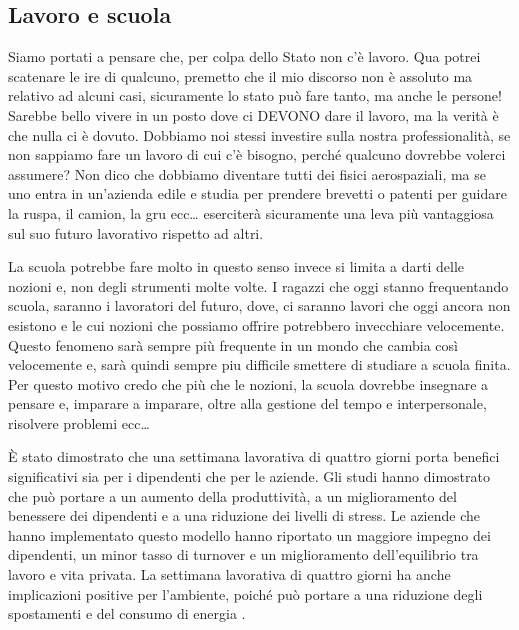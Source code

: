 \documentclass[12pt]{book} %
\begin{document}
\subsection{Lavoro e scuola}
Siamo portati a pensare che, per colpa dello Stato non
c'è lavoro. Qua potrei scatenare le ire di qualcuno, premetto che il mio discorso non è assoluto
ma relativo ad alcuni casi, sicuramente lo stato può fare tanto, ma anche le persone! Sarebbe bello vivere in un posto
dove ci DEVONO dare il lavoro, ma la verità è che nulla ci è dovuto. Dobbiamo noi stessi investire sulla nostra
professionalità, se non sappiamo fare un lavoro di cui c'è bisogno, perché qualcuno dovrebbe volerci assumere? Non dico che dobbiamo
diventare tutti dei fisici aerospaziali, ma se uno entra in un'azienda edile e studia per prendere
brevetti o patenti per guidare la ruspa, il camion, la gru ecc… eserciterà sicuramente una leva più vantaggiosa sul suo
futuro lavorativo rispetto ad altri. 

La scuola potrebbe fare molto in questo senso invece si
limita a darti delle nozioni e, non degli strumenti molte volte. I ragazzi che oggi stanno frequentando scuola, saranno
i lavoratori del futuro, dove, ci saranno lavori che oggi ancora non esistono e le cui nozioni che possiamo offrire potrebbero invecchiare velocemente. Questo fenomeno sarà sempre più frequente in un mondo che cambia così velocemente e, sarà quindi sempre piu difficile smettere di studiare a scuola finita. Per questo motivo credo che più che le nozioni, la scuola dovrebbe insegnare a pensare e, imparare a imparare, oltre alla gestione del tempo e interpersonale, risolvere problemi ecc… 

\begin{mdframed}[linewidth=1pt]
È stato dimostrato che una settimana lavorativa di quattro giorni porta benefici significativi sia per i dipendenti che per le aziende. Gli studi hanno dimostrato che può portare a un aumento della produttività, a un miglioramento del benessere dei dipendenti e a una riduzione dei livelli di stress. Le aziende che hanno implementato questo modello hanno riportato un maggiore impegno dei dipendenti, un minor tasso di turnover e un miglioramento dell'equilibrio tra lavoro e vita privata. La settimana lavorativa di quattro giorni ha anche implicazioni positive per l'ambiente, poiché può portare a una riduzione degli spostamenti e del consumo di energia .
\end{mdframed}
\end{document}
